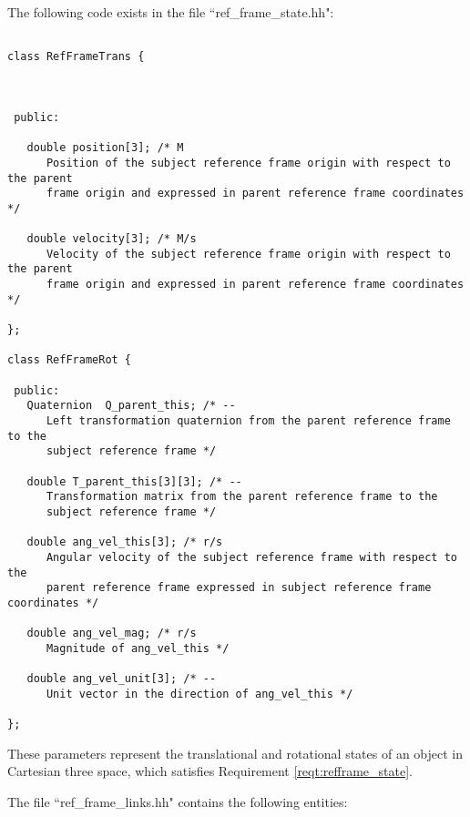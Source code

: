 \label{inspect:refframe_state}

The following code exists in the file ``ref\_frame\_state.hh":

\begin{verbatim}

class RefFrameTrans {



 public:

   double position[3]; /* M
      Position of the subject reference frame origin with respect to the parent
      frame origin and expressed in parent reference frame coordinates */

   double velocity[3]; /* M/s
      Velocity of the subject reference frame origin with respect to the parent
      frame origin and expressed in parent reference frame coordinates */

};

class RefFrameRot {

 public:
   Quaternion  Q_parent_this; /* --
      Left transformation quaternion from the parent reference frame to the
      subject reference frame */

   double T_parent_this[3][3]; /* --
      Transformation matrix from the parent reference frame to the
      subject reference frame */

   double ang_vel_this[3]; /* r/s
      Angular velocity of the subject reference frame with respect to the
      parent reference frame expressed in subject reference frame coordinates */

   double ang_vel_mag; /* r/s
      Magnitude of ang_vel_this */

   double ang_vel_unit[3]; /* --
      Unit vector in the direction of ang_vel_this */

};

\end{verbatim}

These parameters represent the translational and rotational states of an
object in Cartesian three space, which satisfies Requirement
\ref{reqt:refframe_state}.

\label{inspect:refframe_struct}

The file ``ref\_frame\_links.hh" contains the following entities:

